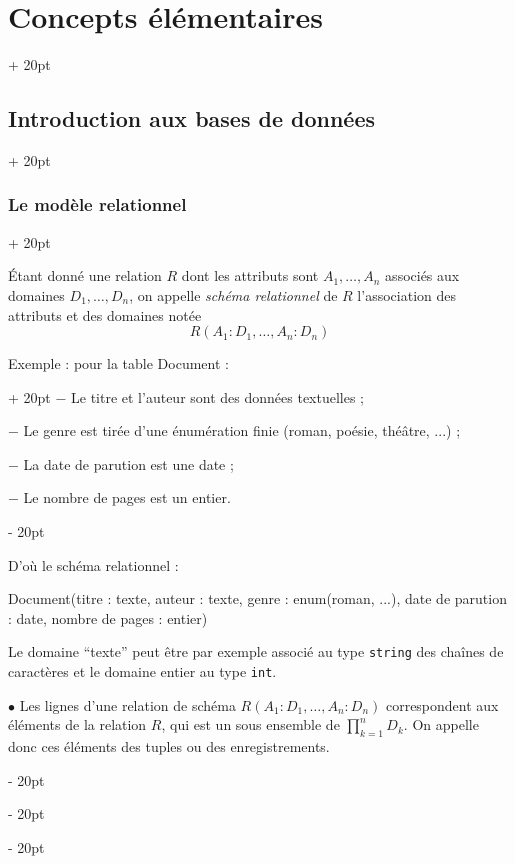 \documentclass[a4paper, 12pt, twoside]{article}
\newcommand{\ind}[1][20pt]{\advance\leftskip + #1}
\newcommand{\deind}[1][20pt]{\advance\leftskip - #1}
\newenvironment{indt}[2][20pt]{#2 \par \ind[#1]}{\par \deind} %
\begin{document}
\begin{indt}{\section{Concepts élémentaires}}
\begin{indt}{\subsection{Introduction aux bases de données}}
\begin{indt}{\subsubsection{Le modèle relationnel}}
                \vspace{6pt}
                
                \'Etant donné une relation $R$ dont les attributs sont $A_1, \ldots, A_n$ associés aux domaines $D_1, \ldots, D_n$, on appelle \textit{schéma relationnel} de $R$ l'association des attributs et des domaines notée
                    \[ R(A_1 : D_1, \ldots, A_n : D_n) \]
                
                \begin{indt}{Exemple : pour la table Document :}
                    $-$ Le titre et l'auteur sont des données textuelles ;
                    
                    $-$ Le genre est tirée d'une énumération finie (roman, poésie, théâtre, ...) ;
                    
                    $-$ La date de parution est une date ;
                    
                    $-$ Le nombre de pages est un entier.
                \end{indt}
                
                \vspace{6pt}
                
                D'où le schéma relationnel :
                
                Document(titre : texte, auteur : texte, genre : enum(roman, ...), date de parution : date, nombre de pages : entier)
                
                \vspace{6pt}
                
                Le domaine ``texte'' peut être par exemple associé au type \texttt{string} des chaînes de caractères et le domaine entier au type \texttt{int}.
                
                \vspace{12pt}
                
                $\bullet$ Les lignes d'une relation de schéma $R(A_1 : D_1, \ldots, A_n : D_n)$ correspondent aux éléments de la relation $R$, qui est un sous ensemble de $\displaystyle \prod_{k = 1}^n D_k$. On appelle donc ces éléments des tuples ou des enregistrements.
                
                \vspace{6pt}
                

\end{indt}
\end{indt}
\end{indt}
\end{document}
